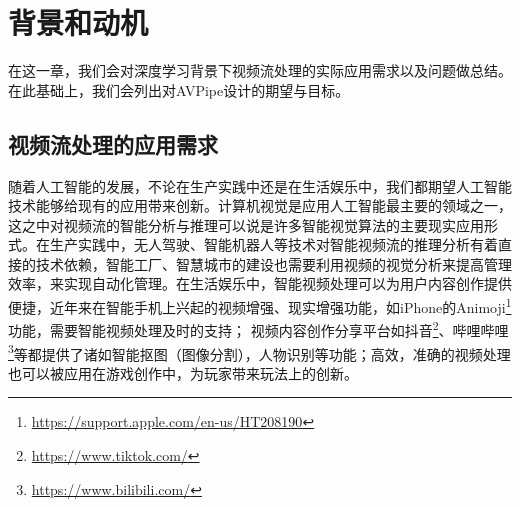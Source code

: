
\chapter{背景和动机}
在这一章，我们会对深度学习背景下视频流处理的实际应用需求以及问题做总结。在此基础上，我们会列出对AVPipe设计的期望与目标。
\section{视频流处理的应用需求}\label{ch3:req}
随着人工智能的发展，不论在生产实践中还是在生活娱乐中，我们都期望人工智能技术能够给现有的应用带来创新。计算机视觉是应用人工智能最主要的领域之一，这之中对视频流的智能分析与推理可以说是许多智能视觉算法的主要现实应用形式。在生产实践中，无人驾驶、智能机器人等技术对智能视频流的推理分析有着直接的技术依赖，智能工厂、智慧城市的建设也需要利用视频的视觉分析来提高管理效率，来实现自动化管理。在生活娱乐中，智能视频处理可以为用户内容创作提供便捷，近年来在智能手机上兴起的视频增强、现实增强功能，如iPhone的Animoji\footnote{\url{https://support.apple.com/en-us/HT208190}}功能，需要智能视频处理及时的支持；
视频内容创作分享平台如抖音\footnote{\url{https://www.tiktok.com/}}、哔哩哔哩\footnote{\url{https://www.bilibili.com/}}等都提供了诸如智能抠图（图像分割），人物识别等功能；高效，准确的视频处理也可以被应用在游戏创作中，为玩家带来玩法上的创新。\par


